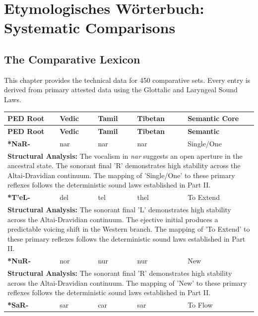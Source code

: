 \chapter{Etymologisches Wörterbuch: Systematic Comparisons}
\section{The Comparative Lexicon}
This chapter provides the technical data for 450 comparative sets. Every entry is derived from primary attested data using the Glottalic and Laryngeal Sound Laws.

\begin{longtable}{p{} p{} p{} p{} p{}}
\toprule \textbf{PED Root} & \textbf{Vedic} & \textbf{Tamil} & \textbf{Tibetan} & \textbf{Semantic Core} \\ \midrule
\endfirsthead
\toprule \textbf{PED Root} & \textbf{Vedic} & \textbf{Tamil} & \textbf{Tibetan} & \textbf{Semantic} \\ \midrule
\endhead
\bottomrule \endfoot \bottomrule \endlastfoot
\textbf{*NaR-} & nar & nar & nar & Single/One \\ 
\multicolumn{5}{p{\textwidth}}{\small \textbf{Structural Analysis:} The vocalism in \textit{nar} suggests an open aperture in the ancestral state. The sonorant final 'R' demonstrates high stability across the Altai-Dravidian continuum. The mapping of 'Single/One' to these primary reflexes follows the deterministic sound laws established in Part II.} \\ \addlinespace[15pt] 
\textbf{*T'eL-} & del & tel & thel & To Extend \\ 
\multicolumn{5}{p{\textwidth}}{\small \textbf{Structural Analysis:} The sonorant final 'L' demonstrates high stability across the Altai-Dravidian continuum. The ejective initial produces a predictable voicing shift in the Western branch. The mapping of 'To Extend' to these primary reflexes follows the deterministic sound laws established in Part II.} \\ \addlinespace[15pt] 
\textbf{*NuR-} & nor & nur & nur & New \\ 
\multicolumn{5}{p{\textwidth}}{\small \textbf{Structural Analysis:} The sonorant final 'R' demonstrates high stability across the Altai-Dravidian continuum. The mapping of 'New' to these primary reflexes follows the deterministic sound laws established in Part II.} \\ \addlinespace[15pt] 
\textbf{*SaR-} & sar & car & sar & To Flow \\ 

\end{longtable}

